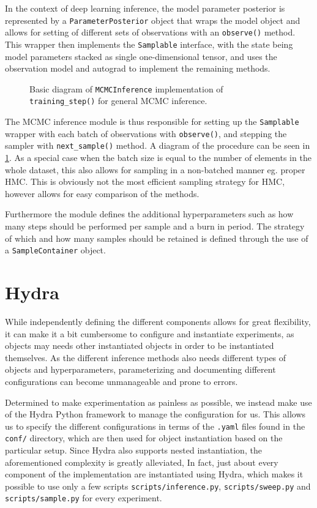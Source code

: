 In the context of deep learning inference, the model parameter posterior is represented by a \texttt{ParameterPosterior} object that wraps the model object and allows for setting of different sets of observations with an \texttt{observe()} method.
This wrapper then implements the \texttt{Samplable} interface, with the state being model parameters stacked as single one-dimensional tensor, and uses the observation model and autograd to implement the remaining methods.
\begin{figure}[htbp]
    \centering
    
    \caption{Basic diagram of \texttt{MCMCInference} implementation of \texttt{training\_step()} for general MCMC inference.}
    \label{fig:mcmc-arch}
\end{figure}
The MCMC inference module is thus responsible for setting up the \texttt{Samplable} wrapper with each batch of observations with \texttt{observe()}, and stepping the sampler with \texttt{next\_sample()} method. 
A diagram of the procedure can be seen in \cref{fig:mcmc-arch}.
As a special case when the batch size is equal to the number of elements in the whole dataset, this also allows for sampling in a non-batched manner eg. proper HMC.
This is obviously not the most efficient sampling strategy for HMC, however allows for easy comparison of the methods.

Furthermore the module defines the additional hyperparameters such as how many steps should be performed per sample and a burn in period.
The strategy of which and how many samples should be retained is defined through the use of a \texttt{SampleContainer} object.

\section{Hydra}

While independently defining the different components allows for great flexibility, it can make it a bit cumbersome to configure and instantiate experiments, as objects may needs other instantiated objects in order to be instantiated themselves.
As the different inference methods also needs different types of objects and hyperparameters, parameterizing and documenting different configurations can become unmanageable and prone to errors.

Determined to make experimentation as painless as possible, we instead make use of the Hydra Python framework to manage the configuration for us.  
This allows us to specify the different configurations in terms of the \texttt{.yaml} files found in the \texttt{conf/} directory, which are then used for object instantiation based on the particular setup. 
Since Hydra also supports nested instantiation, the aforementioned complexity is greatly alleviated,
In fact, just about every component of the implementation are instantiated using Hydra, which makes it possible to use only a few scripts \texttt{scripts/inference.py}, \texttt{scripts/sweep.py} and \texttt{scripts/sample.py} for every experiment. 

